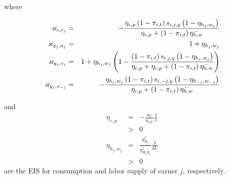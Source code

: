 \documentclass[notes=show]{beamer}
\begin{document}
\begin{frame}%


where

\begin{eqnarray}
\varkappa _{c,v_{j}} &=&-\frac{\eta _{c,p}\left( 1-\pi _{i,t}\right)
s_{i,j,y}\left( 1-\eta _{h_{j},w_{j}}\right) }{\eta _{c,p}+\left( 1-\pi
_{i,t}\right) \overset{\_}{\eta _{h,w}}} \\
\varkappa _{y_{j},u_{j}} &=&1+\eta _{h_{j},w_{j}}  \notag \\
\varkappa _{y_{j},v_{j}} &=&1+\eta _{h_{j},w_{j}}\left( 1-\frac{\left( 1-\pi
_{i,t}\right) s_{i,j,y}\left( 1-\eta _{h_{j},w_{j}}\right) }{\eta
_{c,p}+\eta _{c,p}+\left( 1-\pi _{i,t}\right) \overset{\_}{\eta _{h,w}}}%
\right)  \notag \\
\varkappa _{y_{j},v_{-j}} &=&-\frac{\eta _{h_{j},w_{j}}\left( 1-\pi
_{i,t}\right) s_{i,-j,y}\left( 1-\eta _{h_{-j},w_{-j}}\right) }{\eta
_{c,p}+\left( 1-\pi _{i,t}\right) \overset{\_}{\eta _{h,w}}}  \notag
\end{eqnarray}

\transboxout%
\end{frame}%

\bigskip

\begin{frame}%


and 
\begin{eqnarray*}
\eta _{c,p} &=&-\frac{u_{C}}{u_{CC}}\frac{1}{c} \\
&>&0 \\
\eta _{h_{j},w_{j}} &=&\frac{g_{H_{j}}^{j}}{g_{H_{j}H_{j}}^{j}}\frac{1}{H_{j}%
} \\
&>&0
\end{eqnarray*}%
are the EIS for consumption and labor supply of earner $j$, respectively.

\transboxout%
\end{frame}%
\end{document}
